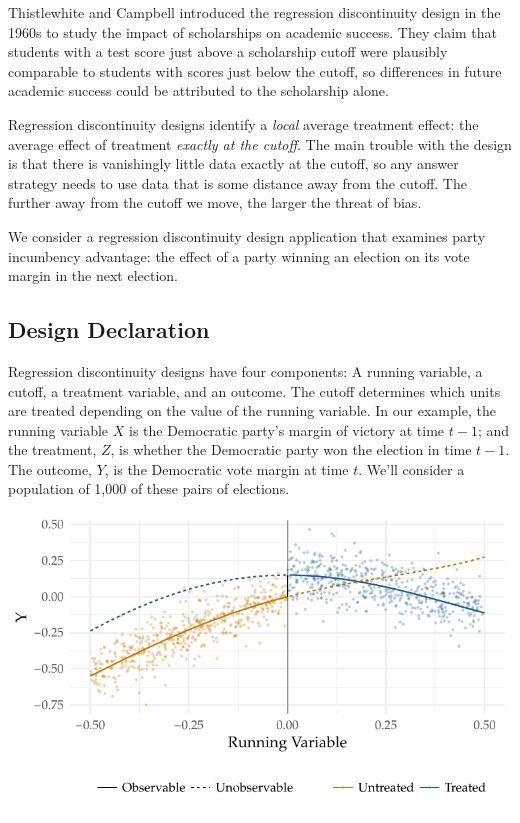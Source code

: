 \documentclass[11pt]{article}\usepackage[]{graphicx}\usepackage[]{color}
\makeatletter
\def\maxwidth{ %
  \ifdim\Gin@nat@width>\linewidth
    \linewidth
  \else
    \Gin@nat@width
  \fi
}
\newenvironment{knitrout}{}{} %
\newcommand\M{\marginnote{\LARGE \sc M}\noindent}
\makeatother
\begin{document}
Thistlewhite and Campbell introduced the regression discontinuity design in the 1960s to study the impact of scholarships on academic success. They claim that students with a test score just above a scholarship cutoff were plausibly comparable to students with scores just below the cutoff, so differences in future academic success could be attributed to the scholarship alone.

Regression discontinuity designs identify a {\it local} average treatment effect: the average effect of treatment {\it exactly at the cutoff}. The main trouble with the design is that there is vanishingly little data exactly at the cutoff, so any answer strategy needs to use data that is some distance away from the cutoff. The further away from the cutoff we move, the larger the threat of bias.

We consider a regression discontinuity design application that examines party incumbency advantage: the effect of a party winning an election on its vote margin in the next election. \smallskip

\subsection*{Design Declaration}

\M Regression discontinuity designs have four components: A running variable, a cutoff, a treatment variable, and an outcome. The cutoff determines which units are treated depending on the value of the running variable. In our example, the running variable $X$ is the Democratic party's margin of victory at time $t-1$; and the treatment, $Z$, is whether the Democratic party won the election in time $t-1$. The outcome, $Y$, is the Democratic vote margin at time $t$. We'll consider a population of 1,000 of these pairs of elections.
    
    \vspace{1em}
    
\hspace{2em}
\begin{knitrout}\small
{}\color{fgcolor}
\includegraphics[width=\maxwidth]{figure/unnamed-chunk-7-1} 

\end{knitrout}
\end{document}
